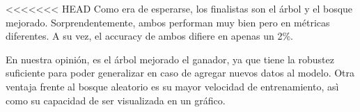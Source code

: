 \documentclass[a4paper]{article}
\begin{document}
<<<<<<< HEAD
    Como era de esperarse, los finalistas son el árbol y el bosque mejorado. Sorprendentemente, ambos performan muy bien pero en métricas diferentes. A su vez, el accuracy de ambos difiere en apenas un 2\%.

    En nuestra opinión, es el árbol mejorado el ganador, ya que tiene la robustez suficiente para poder generalizar en caso de agregar nuevos datos al modelo. Otra ventaja frente al bosque aleatorio es su mayor velocidad de entrenamiento, asì como su capacidad de ser visualizada en un gráfico.
        
\end{document}
